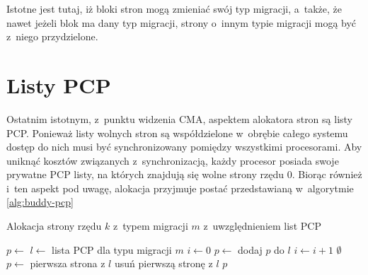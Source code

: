 Istotne jest tutaj, iż bloki stron mogą zmieniać swój typ migracji,
a~także, że nawet jeżeli blok ma dany typ migracji, strony o~innym
typie migracji mogą być z~niego przydzielone.


\section{Listy PCP}

Ostatnim istotnym, z~punktu widzenia CMA, aspektem alokatora stron są
listy PCP.  Ponieważ listy wolnych stron są współdzielone w~obrębie
całego systemu dostęp do nich musi być synchronizowany pomiędzy
wszystkimi procesorami.  Aby uniknąć kosztów związanych
z~synchronizacją, każdy procesor posiada swoje prywatne PCP listy, na
których znajdują się wolne strony rzędu 0.  Biorąc również i~ten
aspekt pod uwagę, alokacja przyjmuje postać przedstawianą w~algorytmie
\ref{alg:buddy-pcp}

\begin{algorithm}
\caption{Alokacja strony rzędu $k$ z~typem migracji $m$
  z~uwzględnieniem list PCP}
\label{alg:buddy-pcp}
\begin{algorithmic}[1]
        \State $p \gets$ 
    \Else
        \State $l \gets$ lista PCP dla typu migracji $m$
            \State $i \gets 0$
            \Repeat
                \State $p \gets$ 
                    \State dodaj $p$ do $l$
                    \State $i \gets i + 1$
                \EndIf
             
        \EndIf
            \State \Return $\emptyset$
        \Else
            \State $p \gets$ pierwsza strona z $l$
            \State usuń pierwszą stronę z $l$
        \EndIf
    \EndIf
    \State \Return $p$
\EndFunction
\end{algorithmic}
\end{algorithm}
